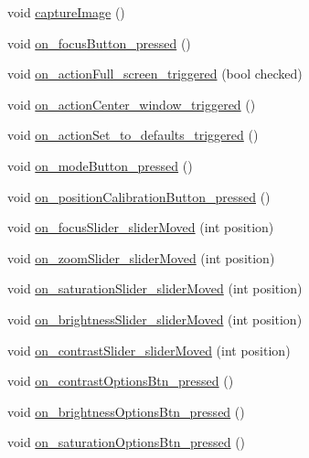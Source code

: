 \begin{DoxyCompactItemize}
\item 
void \mbox{\hyperlink{class_main_window_a22df50c440a9aa974654f787d5935761}{capture\+Image}} ()
\item 
void \mbox{\hyperlink{class_main_window_a5e9d6c6b9249ee3478427d2e33dfb901}{on\+\_\+focus\+Button\+\_\+pressed}} ()
\item 
void \mbox{\hyperlink{class_main_window_ad210784d93519aa0e1664b943142ad97}{on\+\_\+action\+Full\+\_\+screen\+\_\+triggered}} (bool checked)
\item 
void \mbox{\hyperlink{class_main_window_a6ced641b27821f153cd80aef4719fe41}{on\+\_\+action\+Center\+\_\+window\+\_\+triggered}} ()
\item 
void \mbox{\hyperlink{class_main_window_a3292a73fad4dfd479598ea5166e293c9}{on\+\_\+action\+Set\+\_\+to\+\_\+defaults\+\_\+triggered}} ()
\item 
void \mbox{\hyperlink{class_main_window_a295d30310cac58053dd2218f04a525c8}{on\+\_\+mode\+Button\+\_\+pressed}} ()
\item 
void \mbox{\hyperlink{class_main_window_ad8b394c839532c8b74fb8c7602d3da89}{on\+\_\+position\+Calibration\+Button\+\_\+pressed}} ()
\item 
void \mbox{\hyperlink{class_main_window_a4984f1218d13c28b7dd40f9e1cc9b9be}{on\+\_\+focus\+Slider\+\_\+slider\+Moved}} (int position)
\item 
void \mbox{\hyperlink{class_main_window_a6ae3fbe8e4f3f10db4f2e0e495b98841}{on\+\_\+zoom\+Slider\+\_\+slider\+Moved}} (int position)
\item 
void \mbox{\hyperlink{class_main_window_abd0b71ebb4667aa574bfa870ade22f58}{on\+\_\+saturation\+Slider\+\_\+slider\+Moved}} (int position)
\item 
void \mbox{\hyperlink{class_main_window_aaaa1dd957c7f0cc75f5dec42ef429c81}{on\+\_\+brightness\+Slider\+\_\+slider\+Moved}} (int position)
\item 
void \mbox{\hyperlink{class_main_window_ac9e59c581b41ab29cd61b41447cb74ef}{on\+\_\+contrast\+Slider\+\_\+slider\+Moved}} (int position)
\item 
void \mbox{\hyperlink{class_main_window_a803bb81c63591b7f6c3306f712438378}{on\+\_\+contrast\+Options\+Btn\+\_\+pressed}} ()
\item 
void \mbox{\hyperlink{class_main_window_a8b3a042f694a5013ad5e65253bc3a0ae}{on\+\_\+brightness\+Options\+Btn\+\_\+pressed}} ()
\item 
void \mbox{\hyperlink{class_main_window_aa663ee1d7e10715e4998923eb87e5d15}{on\+\_\+saturation\+Options\+Btn\+\_\+pressed}} ()

\end{DoxyCompactItemize}
